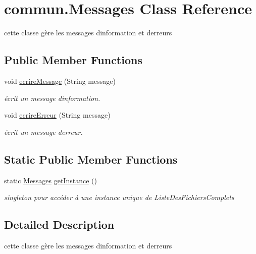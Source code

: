 \hypertarget{classcommun_1_1Messages}{}\section{commun.\+Messages Class Reference}
\label{classcommun_1_1Messages}


cette classe gère les messages d\textquotesingle{}information et d\textquotesingle{}erreurs  


\subsection*{Public Member Functions}
\begin{DoxyCompactItemize}
\item 
void \hyperlink{classcommun_1_1Messages_a73b88c0e0beb3741f20c5d51537cc427}{ecrire\+Message} (String message)
\begin{DoxyCompactList}\small\item\em écrit un message d\textquotesingle{}information. \end{DoxyCompactList}\item 
void \hyperlink{classcommun_1_1Messages_a73671f6e67c65f0c63ac3a88bc9d9c68}{ecrire\+Erreur} (String message)
\begin{DoxyCompactList}\small\item\em écrit un message d\textquotesingle{}erreur. \end{DoxyCompactList}\end{DoxyCompactItemize}
\subsection*{Static Public Member Functions}
\begin{DoxyCompactItemize}
\item 
static \hyperlink{classcommun_1_1Messages}{Messages} \hyperlink{classcommun_1_1Messages_a6bcea8789efaf25afeb2614c99e888de}{get\+Instance} ()
\begin{DoxyCompactList}\small\item\em singleton pour accéder à une instance unique de Liste\+Des\+Fichiers\+Complets \end{DoxyCompactList}\end{DoxyCompactItemize}


\subsection{Detailed Description}
cette classe gère les messages d\textquotesingle{}information et d\textquotesingle{}erreurs 

